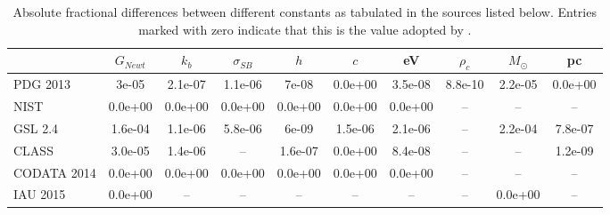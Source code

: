 \begin{table}
  \centering
  \caption{Absolute fractional differences between different constants as tabulated in the sources listed below. Entries marked with zero indicate that this is the value adopted by \ccl. \label{tab:constants}}
  \begin{tabular}{lccccccccc}
    \hline\hline
    & $G_{Newt}$ & $k_b$ & $\sigma_{SB}$ & $h$ & $c$ & eV & $\rho_c$ & $M_\odot$ & pc \\
    \hline
    PDG 2013 & 3e-05 & 2.1e-07 & 1.1e-06 & 7e-08 & 0.0e+00 & 3.5e-08 & 8.8e-10 & 2.2e-05 & 0.0e+00 \\[3pt]
    NIST & 0.0e+00 & 0.0e+00 & 0.0e+00 & 0.0e+00 & 0.0e+00 & 0.0e+00 & \--- & \--- & \--- \\[3pt]
    GSL 2.4 & 1.6e-04 & 1.1e-06 & 5.8e-06 & 6e-09 & 1.5e-06 & 2.1e-06 & \--- & 2.2e-04 & 7.8e-07 \\[3pt]
    CLASS & 3.0e-05 & 1.4e-06 & \--- & 1.6e-07 & 0.0e+00 & 8.4e-08 & \--- & \--- & 1.2e-09 \\[3pt]
    CODATA 2014 & 0.0e+00 & 0.0e+00 & 0.0e+00 & 0.0e+00 & 0.0e+00 & 0.0e+00 & \--- & \--- & \--- \\[3pt]
    IAU 2015 & 0.0e+00 & \--- & \--- & \--- & \--- & \--- & \--- & 0.0e+00 & \--- \\
    \hline\hline
  \end{tabular}
\end{table}

